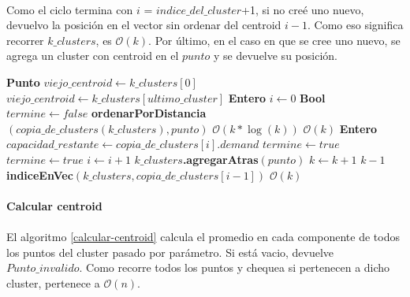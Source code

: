 \paragraph{}Como el ciclo termina con $i$ = $indice\_del\_cluster$+1, si no creé uno nuevo, devuelvo la posición en el vector sin ordenar del centroid $i-1$. Como eso significa recorrer $k\_clusters$, es $\mathcal{O}(k)$. Por último, en el caso en que se cree uno nuevo, se agrega un cluster con centroid en el $punto$ y se devuelve su posición.
\begin{algorithm}[H]
	\caption{\Comment $\mathcal{O}(k*\log(k))$}
	\label{centroid-mas-cercano}
	\begin{algorithmic}[1]
		\State \textbf{Punto } $viejo\_centroid \gets k\_clusters[0]$
		\State $viejo\_centroid \gets k\_clusters[ultimo\_cluster]$
		\EndIf 
		\State \textbf{Entero } $i \gets 0$
		\State \textbf{Bool } $termine \gets false$
		\State \textbf{ordenarPorDistancia}$(copia\_de\_clusters(k\_clusters), punto)$ \Comment $\mathcal{O}(k*\log(k))$
		\Statex
		 \Comment $\mathcal{O}(k)$
		\State \textbf{Entero } $capacidad\_restante \gets copia\_de\_clusters[i].demand$ 
		\State $termine \gets true$
		\EndIf
		\Else
		\State $termine \gets true$
		\EndIf
		\State $i \gets i+1$
		\EndWhile
		\Statex
		\State $k\_clusters$\textbf{.agregarAtras}$(punto)$
		\State $k \gets k+1$
		\State \Return $k-1$
		\EndIf
		\State \Return \textbf{indiceEnVec}$(k\_clusters, copia\_de\_clusters[i-1])$  \Comment $\mathcal{O}(k)$
		\EndFunction
	\end{algorithmic}
\end{algorithm}

\paragraph{Calcular centroid}
\paragraph{} El algoritmo \ref{calcular-centroid} calcula el promedio en cada componente de todos los puntos del cluster pasado por parámetro. Si está vacio, devuelve $Punto\_invalido$. Como recorre todos los puntos y chequea si pertenecen a dicho cluster, pertenece a $\mathcal{O}(n)$.
